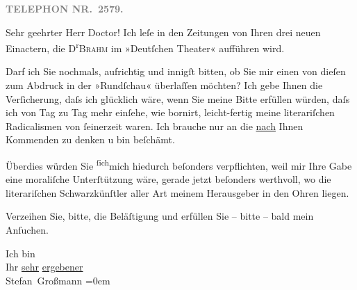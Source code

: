 \pstart
           \textcolor{gray}{\textbf{TELEPHON NR. 2579.}}\pend
           
\pstart\center{}Sehr geehrter Herr Doctor!\pend\vspace{0.5em}
\pstart
           Ich leſe in den Zeitungen von \introOben{}Ihren\introOben{} drei neuen Einactern, die D\textsuperscript{r}\textsc{Brahm} im »Deutſchen Theater« aufführen wird.\pend
           
\pstart
           Darf ich Sie nochmals, aufrichtig und innigſt bitten, ob Sie mir einen von dieſen zum
               Abdruck in der »Rundſchau« überlaſſen möchten?
               Ich gebe Ihnen die Verſicherung, daſs ich glücklich wäre, wenn Sie meine Bitte
               erfüllen würden, daſs ich von Tag zu Tag \strikeout{\textcolor{gray}{×}\-\textcolor{gray}{×}} mehr einſehe, wie bornirt, leicht-fertig meine  literariſchen Radicalismen von{ }ſeinerzeit waren. Ich brauche nur an
               die \uline{nach} Ihnen Kommenden zu denken u bin
               beſchämt.\pend
           
\pstart
           Überdies würden Sie \substVorne{}\textsuperscript{ſich}\substDazwischen{}mich\substHinten{} hiedurch beſonders verpflichten, weil mir Ihre Gabe eine moraliſche Unter{\pb}ſtützung wäre, gerade jetzt beſonders
               werthvoll, wo die literariſchen Schwarzkünſtler aller Art meinem Herausgeber in den Ohren
               liegen.\pend
           
\pstart
           Verzeihen Sie, bitte, die Beläſtigung und erfüllen Sie – bitte – bald mein
               Anſuchen.\pend
           
\pstart
           Ich bin{\\[\baselineskip]} Ihr \uline{sehr}{ }\uline{ergebener}{\\[\baselineskip]}\spacefill\mbox{Stefan Großmann}\pend
           \leftskip=0em{}\endnumbering{}  \newcommand{\dateiname}{L00847}\newcommand{\titel}{Stefan Großmann an Arthur Schnitzler, 16. 9. 1898}\newcommand{\editorInnen}{Herausgegeben von Martin Anton Müller}
